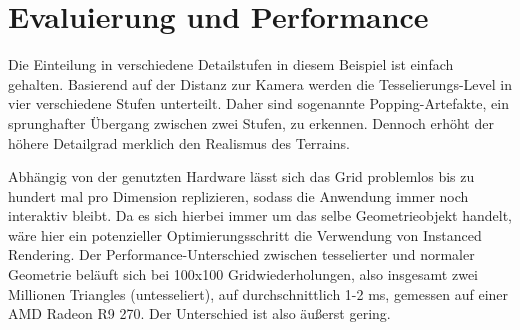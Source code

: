 \documentclass[a4paper,10pt]{article}
\begin{document}
\section*{Evaluierung und Performance}
Die Einteilung in verschiedene Detailstufen in diesem Beispiel ist einfach gehalten.  Basierend auf der Distanz zur Kamera werden die Tesselierungs-Level in vier verschiedene Stufen unterteilt. Daher sind sogenannte Popping-Artefakte, ein sprunghafter Übergang zwischen zwei Stufen, zu erkennen. Dennoch erhöht der höhere Detailgrad merklich den Realismus des Terrains. 

Abhängig von der genutzten Hardware lässt sich das Grid problemlos bis zu hundert mal pro Dimension replizieren, sodass die Anwendung immer noch interaktiv bleibt. Da es sich hierbei immer um das selbe Geometrieobjekt handelt, wäre hier ein potenzieller Optimierungsschritt die Verwendung von Instanced Rendering. 
Der Performance-Unterschied zwischen tesselierter und normaler Geometrie beläuft sich bei 100x100 Gridwiederholungen, also insgesamt zwei Millionen Triangles (untesseliert), auf durchschnittlich 1-2 ms, gemessen auf einer AMD Radeon R9 270. Der Unterschied ist also äußerst gering. 



\end{document}
